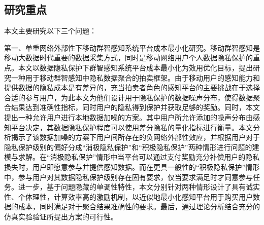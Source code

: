 

\subsection{研究重点}

本文主要研究以下三个问题：

第一、单重网络外部性下移动群智感知系统平台成本最小化研究。移动群智感知是移动大数据时代重要的数据采集方式，同时是移动网络用户个人数据隐私保护的重点。本文以数据隐私保护下群智感知系统平台成本最小化为效用优化目标，提出研究一种用于移动群智感知中隐私数据聚合的拍卖框架。由于移动用户的感知能力和提供数据的隐私成本是有差异的，充当拍卖者角色的感知平台的主要挑战在于选择合适的参与用户，为此本文为他们设计用于隐私保护的数据噪声分布，使得数据聚合结果达到准确性指标，同时用户的隐私得到保护并获取足够的奖励。同时，本文提出一种允许用户进行本地数据加噪的方案。其中用户所允许添加的噪声分布由感知平台决定，其数据隐私保护程度可以使用差分隐私的量化指标进行衡量。本文分析揭示了该数据加噪的方案下用户间所存在的{\kaishu 负网络外部性}效应，并根据用户对于隐私保护级别的偏好分成“消极隐私保护”和“积极隐私保护”两种情形进行问题的建模与求解。在“消极隐私保护”情形中当平台可以通过支付奖励充分补偿用户的隐私损失时，用户即愿意参与并提供感知数据。而在更具一般性的“积极隐私保护”情形中，参与用户对其数据隐私保护级别存在固有要求，仅当要求满足时才同意参与任务。进一步，基于问题隐藏的单调性特性，本文分别针对两种情形设计了具有诚实性、个体理性，计算效率高的激励机制，以近似地最小化感知平台用于购买用户数据的成本，同时满足对于聚合结果准确性的要求。最后，通过理论分析结合充分的仿真实验验证所提出方案的可行性。

